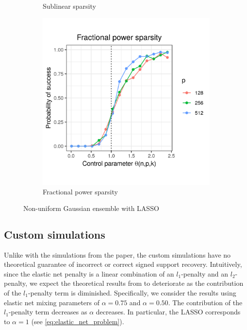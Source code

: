 \documentclass[letterpaper,12pt]{article}
\begin{document}
\begin{figure}[h]
\begin{subfigure}{0.32\textwidth}
    \caption{Sublinear sparsity}
    \label{fig:nonuniform_sublinear_sparsity_alpha_1}
  \end{subfigure}
  \begin{subfigure}{0.32\textwidth}
    \includegraphics[width=0.9\linewidth]{nonuniform_fractional_power_sparsity_alpha_1}
    \caption{Fractional power sparsity}
    \label{fig:nonuniform_fractional_power_sparsity_alpha_1}
  \end{subfigure}
  \caption{Non-uniform Gaussian ensemble with LASSO}
  \label{fig:nonuniform_alpha_1}
\end{figure}

\subsection*{Custom simulations}

Unlike with the simulations from the paper, the custom simulations
have no theoretical guarantee of incorrect or correct signed support
recovery. Intuitively, since the elastic net penalty is a linear
combination of an $l_1$-penalty and an $l_2$-penalty, we expect the
theoretical results from \cite{wainwright06} to deteriorate as the
contribution of the $l_1$-penalty term is diminished. Specifically, we
consider the results using elastic net mixing parameters of
$\alpha = 0.75$ and $\alpha = 0.50$. The contribution of the
$l_1$-penalty term decreases as $\alpha$ decreases. In particular, the
LASSO corresponds to $\alpha = 1$ (see
\eqref{eq:elastic_net_problem}).
\end{document}
